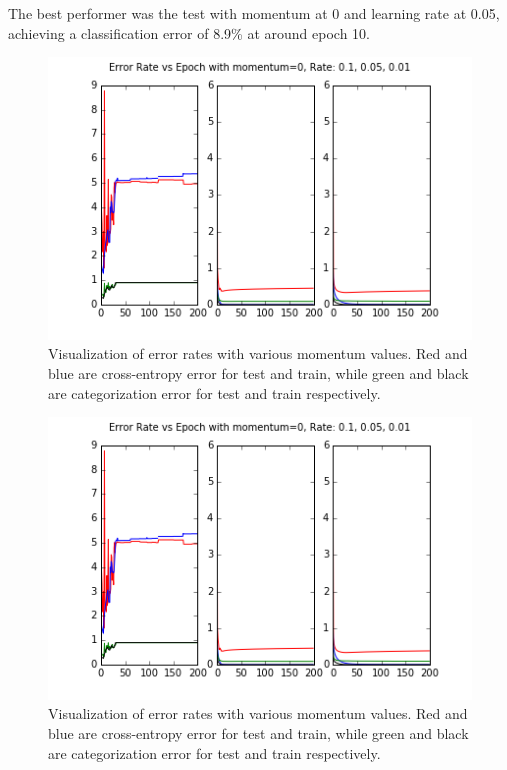 \documentclass{article}
\begin{document}
The best performer was the test with momentum at 0 and learning rate at 0.05, achieving a classification error of 8.9\% at around epoch 10. 	 

\begin{figure}[h]
  \centering
  \includegraphics[scale=0.6]{../momentum0_rate10501.png} 
  \caption{Visualization of error rates with various momentum values. Red and blue are cross-entropy error for test and train, while green and black are categorization error for test and train respectively. }
  \label{fig:momentumsrate1}
\end{figure}



\begin{figure}[h]
  \centering
  \includegraphics[scale=0.6]{../momentum0_rate10501.png} 
  \caption{Visualization of error rates with various momentum values. Red and blue are cross-entropy error for test and train, while green and black are categorization error for test and train respectively. }
  \label{fig:momentumsrate2}
\end{figure}
\end{document}
